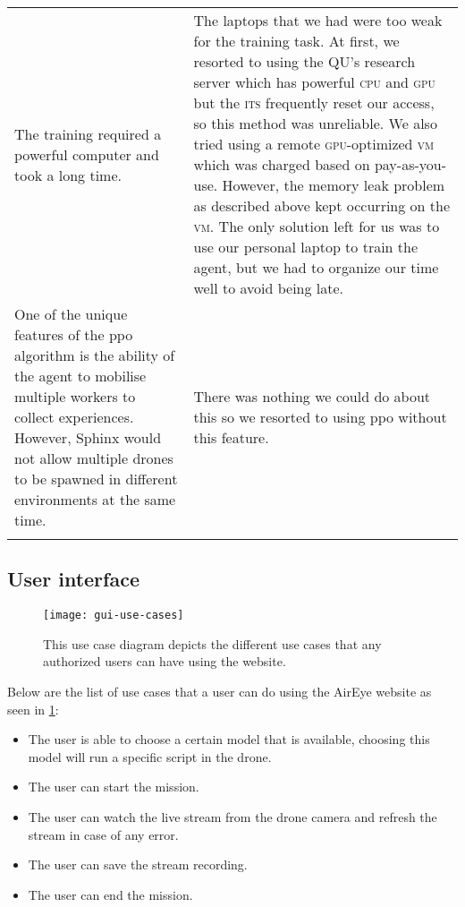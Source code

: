 \documentclass[../main.tex]{subfiles}
\begin{document}
\begin{center}
\begin{xltabular}{\textwidth}{ X X }
        The training required a powerful computer and took a long
        time.
            & 
        The laptops that we had were too weak for the training task. 
        At first, we resorted to using the QU's research server which
        has powerful \textsc{cpu} and \textsc{gpu} but the \textsc{its}
        frequently reset our access, so this method was unreliable.
        We also tried using a remote \textsc{gpu}-optimized
        \textsc{vm} which was charged based on pay-as-you-use.
        However, the memory leak problem as described above kept
        occurring on the \textsc{vm}.
        The only solution left for us was to use our personal laptop
        to train the agent, but we had to organize our time well to
        avoid being late.
            \\ \addlinespace

        One of the unique features of the \gls{ppo} algorithm is the
        ability of the agent to mobilise multiple workers to collect
        experiences. 
        However, Sphinx would not allow multiple drones to be spawned
        in different environments at the same time.
            & 
        There was nothing we could do about this so we resorted to
        using \gls{ppo} without this feature.
            \\ \addlinespace

        \bottomrule		
    \end{xltabular}
\end{center}

\subsection{User interface}

\begin{figure}[tbp] 
	\centering
	\texttt{[image: gui-use-cases]} 
	\caption{This use case diagram depicts the different use cases that any authorized users can have using the website.}
	\label{fig:gui-use-cases} 
\end{figure}

Below are the list of use cases that a user can do using the AirEye
website as seen in \cref{fig:gui-use-cases}: 
\begin{itemize}	
	\item The user is able to choose a certain model that is available, 
	choosing this model will run a specific script in the drone. 
	\item The user can start the mission.
	\item The user can watch the live stream from the drone camera and refresh 
	the stream in case of any error.

	\item The user can save the stream recording. 
	\item The user can end the mission.
\end{itemize}
\end{document}

